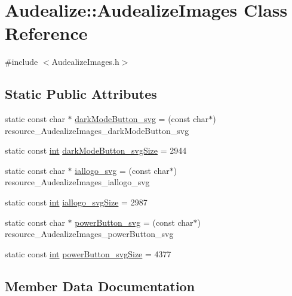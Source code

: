 \hypertarget{class_audealize_1_1_audealize_images}{}\section{Audealize\+:\+:Audealize\+Images Class Reference}
\label{class_audealize_1_1_audealize_images}


{\ttfamily \#include $<$Audealize\+Images.\+h$>$}

\subsection*{Static Public Attributes}
\begin{DoxyCompactItemize}
\item 
static const char $\ast$ \hyperlink{class_audealize_1_1_audealize_images_a648e121e873c0d48aa50001c65ee4383}{dark\+Mode\+Button\+\_\+svg} = (const char$\ast$) resource\+\_\+\+Audealize\+Images\+\_\+dark\+Mode\+Button\+\_\+svg
\item 
static const \hyperlink{tk_8h_a83f82f76e7fed06f4c49d2db94028a6d}{int} \hyperlink{class_audealize_1_1_audealize_images_a3448b57ddf0d2ac3f32012295f0dbc6a}{dark\+Mode\+Button\+\_\+svg\+Size} = 2944
\item 
static const char $\ast$ \hyperlink{class_audealize_1_1_audealize_images_abaf4f444d78268f7b4655d1edf9b5337}{iallogo\+\_\+svg} = (const char$\ast$) resource\+\_\+\+Audealize\+Images\+\_\+iallogo\+\_\+svg
\item 
static const \hyperlink{tk_8h_a83f82f76e7fed06f4c49d2db94028a6d}{int} \hyperlink{class_audealize_1_1_audealize_images_a3216060c18fed8e493a28e3f39a020a1}{iallogo\+\_\+svg\+Size} = 2987
\item 
static const char $\ast$ \hyperlink{class_audealize_1_1_audealize_images_a603300f72b88442487d1862ecc025337}{power\+Button\+\_\+svg} = (const char$\ast$) resource\+\_\+\+Audealize\+Images\+\_\+power\+Button\+\_\+svg
\item 
static const \hyperlink{tk_8h_a83f82f76e7fed06f4c49d2db94028a6d}{int} \hyperlink{class_audealize_1_1_audealize_images_afb26f9d7d3a8496bb571eea5b5de1077}{power\+Button\+\_\+svg\+Size} = 4377
\end{DoxyCompactItemize}


\subsection{Member Data Documentation}
